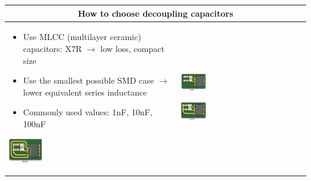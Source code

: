 		\begin{table}[h!]
		\centering
		\begin{tabular}{|m{}|m{}|}
				\multicolumn{2}{c}{\textbf{How to choose decoupling capacitors}}
			\\
			\hline
				\begin{itemize}
					\item Use MLCC (multilayer ceramic) capacitors: X7R $\rightarrow$ low loss, compact size
					\item Use the smallest possible SMD case $\rightarrow$ lower equivalent series inductance
					\item Commonly used values: 1nF, 10nF, 100nF
				\end{itemize}
				\begin{center}\includegraphics[width=0.2\textwidth]{images/Oszi3.png}\end{center}
			& 
				\begin{center}\includegraphics[width=0.2\textwidth]{images/Oszi1.png}\end{center}  
				\begin{center}\includegraphics[width=0.2\textwidth]{images/Oszi2.png}\end{center} 
				   

\end{tabular}
\end{table}
